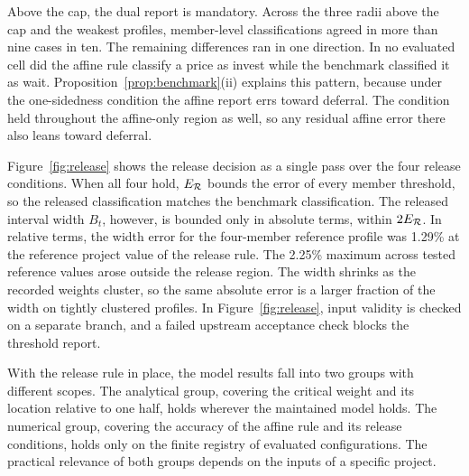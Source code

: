 Above the cap, the dual report is mandatory. Across the three radii above the cap and the weakest profiles, member-level classifications agreed in more than nine cases in ten. The remaining differences ran in one direction. In no evaluated cell did the affine rule classify a price as invest while the benchmark classified it as wait. Proposition~\ref{prop:benchmark}(ii) explains this pattern, because under the one-sidedness condition the affine report errs toward deferral. The condition held throughout the affine-only region as well, so any residual affine error there also leans toward deferral.

Figure~\ref{fig:release} shows the release decision as a single pass over the four release conditions. When all four hold, $E_{\mathcal{R}}$ bounds the error of every member threshold, so the released classification matches the benchmark classification. The released interval width $B_t$, however, is bounded only in absolute terms, within $2E_{\mathcal{R}}$. In relative terms, the width error for the four-member reference profile was 1.29\% at the reference project value of the release rule. The 2.25\% maximum across tested reference values arose outside the release region. The width shrinks as the recorded weights cluster, so the same absolute error is a larger fraction of the width on tightly clustered profiles. In Figure~\ref{fig:release}, input validity is checked on a separate branch, and a failed upstream acceptance check blocks the threshold report.

With the release rule in place, the model results fall into two groups with different scopes. The analytical group, covering the critical weight and its location relative to one half, holds wherever the maintained model holds. The numerical group, covering the accuracy of the affine rule and its release conditions, holds only on the finite registry of evaluated configurations. The practical relevance of both groups depends on the inputs of a specific project.

